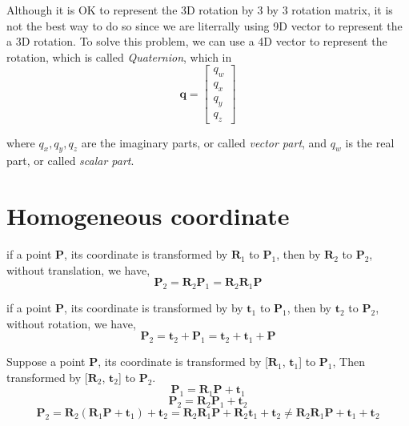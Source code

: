 \documentclass{article}
\begin{document}
Although it is OK to represent the 3D rotation by 3 by 3 rotation matrix, it is not the best way to do so since we are literrally using 9D vector to represent the a 3D rotation. To solve this problem, we can use a 4D vector to represent the rotation, which is called \textit{Quaternion}, which in
\begin{equation}
    \mathbf{q} = 
    \begin{bmatrix}
    q_w \\
    q_x \\
    q_y \\
    q_z
    \end{bmatrix}
\end{equation}

where $q_x, q_y, q_z$ are the imaginary parts, or called \textit{vector part}, and $q_w$ is the real part, or called \textit{scalar part}.



\section{Homogeneous coordinate}
if a point $\mathbf{P}$, its coordinate is transformed by $\mathbf{R}_1$ to $\mathbf{P}_1$, then by $\mathbf{R}_2$ to $\mathbf{P}_2$, without translation, we have,
\begin{equation}
    \mathbf{P}_2 = \mathbf{R}_2 \mathbf{P}_1 = \mathbf{R}_2 \mathbf{R}_1 \mathbf{P}
\end{equation}

if a point $\mathbf{P}$, its coordinate is transformed by by $\mathbf{t}_1$ to $\mathbf{P}_1$, then by $\mathbf{t}_2$ to $\mathbf{P}_2$, without rotation, we have,
\begin{equation}
    \mathbf{P}_2 = \mathbf{t}_2 + \mathbf{P}_1 = \mathbf{t}_2 + \mathbf{t}_1 + \mathbf{P}
\end{equation}

Suppose a point $\mathbf{P}$, its coordinate is transformed by [$\mathbf{R}_1$, $\mathbf{t}_1$] to $\mathbf{P}_1$, Then transformed by [$\mathbf{R}_2$, $\mathbf{t}_2$] to $\mathbf{P}_2$.
\begin{equation}
    \mathbf{P}_1 = \mathbf{R}_1 \mathbf{P} + \mathbf{t}_1
\end{equation}
\begin{equation}
    \mathbf{P}_2 = \mathbf{R}_2 \mathbf{P}_1 + \mathbf{t}_2
\end{equation}
\begin{equation}
    \mathbf{P}_2 = \mathbf{R}_2 (\mathbf{R}_1 \mathbf{P} + \mathbf{t}_1) + \mathbf{t}_2
        = \mathbf{R}_2 \mathbf{R}_1 \mathbf{P} + \mathbf{R}_2 \mathbf{t}_1 + \mathbf{t}_2
        \neq \mathbf{R}_2 \mathbf{R}_1 \mathbf{P} + \mathbf{t}_1 + \mathbf{t}_2
\end{equation}
\end{document}
